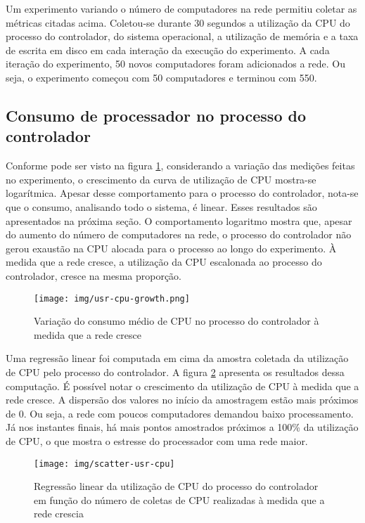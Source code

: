 Um experimento variando o número de computadores na rede permitiu coletar
as métricas citadas acima.
Coletou-se durante 30 segundos a utilização da CPU do processo do controlador,
do sistema operacional, a utilização de memória e a taxa de escrita em disco
em cada interação da execução do experimento.
A cada iteração do experimento, 50 novos computadores foram adicionados a rede.
Ou seja, o experimento começou com 50 computadores e terminou com 550.

\subsection{Consumo de processador no processo do controlador}


Conforme pode ser visto na figura \ref{fig:usr-cpu-growth}, considerando a
variação das medições feitas no experimento, o crescimento da curva de
utilização de CPU mostra-se logarítmica.
Apesar desse comportamento para o processo do controlador, nota-se que o
consumo, analisando todo o sistema, é linear.
Esses resultados são apresentados na próxima seção.
O comportamento logaritmo mostra que, apesar do aumento do número de
computadores na rede, o processo do controlador não gerou exaustão na CPU
alocada para o processo ao longo do experimento.
À medida que a rede cresce, a utilização da CPU escalonada ao processo do
controlador, cresce na mesma proporção.

\begin{figure}[htb!]
    \centering
    \label{fig:usr-cpu-growth}
    \texttt{[image: img/usr-cpu-growth.png]}
    \caption{Variação do consumo médio de CPU no processo do controlador à
    medida que a rede cresce}
\end{figure}

Uma regressão linear foi computada em cima da amostra coletada da utilização
de CPU pelo processo do controlador.
A figura \ref{fig:scatter-usr-cpu} apresenta os resultados dessa computação.
É possível notar o crescimento da utilização de CPU à medida que a rede cresce.
A dispersão dos valores no início da amostragem estão mais próximos de 0.
Ou seja, a rede com poucos computadores demandou baixo processamento.
Já nos instantes finais, há mais pontos amostrados próximos a 100\% da
utilização de CPU, o que mostra o estresse do processador com uma rede maior.

\begin{figure}[!htb]
    \centering
    \label{fig:scatter-usr-cpu}
    \texttt{[image: img/scatter-usr-cpu]}
    \caption{Regressão linear da utilização de CPU do processo do controlador
    em função do número de coletas de CPU realizadas à medida que a rede
    crescia}
\end{figure}

